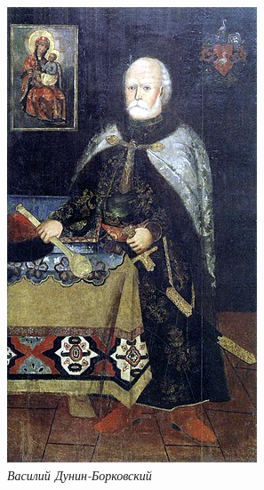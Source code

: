 \documentclass[a5paper,11pt,openany]{article}
\begin{document}
\vspace*{\fill}

\newpage


\begin{center}
\includegraphics[width=0.85\linewidth]{Vasil-Dunin-Borkovskiy.png}\\

\textit{Василий Дунин-Борковский}
\end{center}



\newpage




%

\begin{thebibliography}{999}

\end{thebibliography}
\end{document}
